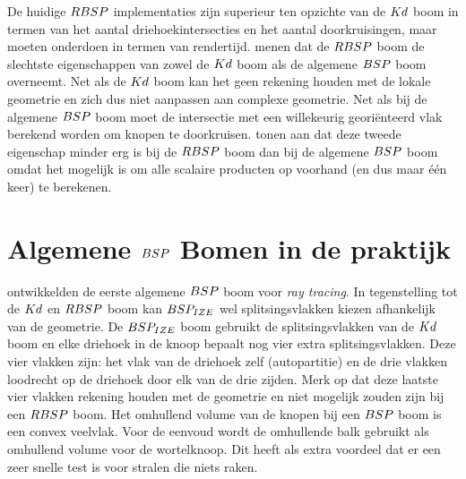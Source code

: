     De huidige $RBSP$ implementaties zijn superieur ten opzichte van de $Kd$ boom in termen van het aantal driehoekintersecties en het aantal doorkruisingen, maar moeten onderdoen in termen van rendertijd.
    \authorIze{} \cite{ize} menen dat de $RBSP$ boom de slechtste eigenschappen van zowel de $Kd$ boom als de algemene $BSP$ boom overneemt. 
    Net als de $Kd$ boom kan het geen rekening houden met de lokale geometrie en zich dus niet aanpassen aan complexe geometrie.
    Net als bij de algemene $BSP$ boom moet de intersectie met een willekeurig georiënteerd vlak berekend worden om knopen te doorkruisen. \authorBudge{} \cite{Budge} tonen aan dat deze tweede eigenschap minder erg is bij de $RBSP$ boom dan bij de algemene $BSP$ boom omdat het mogelijk is om alle scalaire producten op voorhand (en dus maar één keer) te berekenen.

\section{Algemene $BSP$ Bomen in de praktijk}
    \label{sec:h2-bspizefastkd}
    \authorIze{} \cite{ize} ontwikkelden de eerste algemene $BSP$ boom voor \textit{ray tracing}.
    In tegenstelling tot de $Kd$ en $RBSP$ boom kan $BSP_{IZE}$ wel splitsingsvlakken kiezen afhankelijk van de geometrie.
    De $BSP_{IZE}$ boom gebruikt de splitsingsvlakken van de $Kd$ boom en elke driehoek in de knoop bepaalt nog vier extra splitsingsvlakken.
    Deze vier vlakken zijn: het vlak van de driehoek zelf (autopartitie) en de drie vlakken loodrecht op de driehoek door elk van de drie zijden.
    Merk op dat deze laatste vier vlakken rekening houden met de geometrie en niet mogelijk zouden zijn bij een $RBSP$ boom.
    Het omhullend volume van de knopen bij een $BSP$ boom is een convex veelvlak.
    Voor de eenvoud wordt de omhullende balk gebruikt als omhullend volume voor de wortelknoop.
    Dit heeft als extra voordeel dat er een zeer snelle test is voor stralen die niets raken. \\

